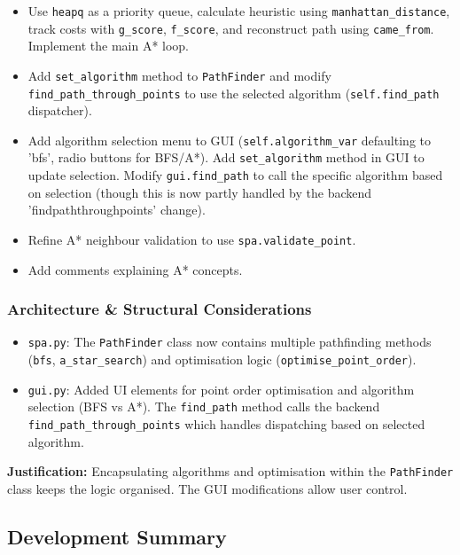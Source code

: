 \begin{enumerate}
\begin{itemize}
		\item Use \verb|heapq| as a priority queue, calculate heuristic using \verb|manhattan_distance|, track costs with \verb|g_score|, \verb|f_score|, and reconstruct path using \verb|came_from|. Implement the main A* loop.
		\item Add \verb|set_algorithm| method to \verb|PathFinder| and modify \verb|find_path_through_points| to use the selected algorithm (\verb|self.find_path| dispatcher).
		\item Add algorithm selection menu to GUI (\verb|self.algorithm_var| defaulting to 'bfs', radio buttons for BFS/A*). Add \verb|set_algorithm| method in GUI to update selection. Modify \verb|gui.find_path| to call the specific algorithm based on selection (though this is now partly handled by the backend 'findpaththroughpoints' change).
		\item Refine A* neighbour validation to use \verb|spa.validate_point|.
		\item Add comments explaining A* concepts.
	\end{itemize}
\end{enumerate}

\subsubsection{Architecture \& Structural Considerations}
\begin{itemize}
	\item \verb|spa.py|: The \verb|PathFinder| class now contains multiple pathfinding methods (\verb|bfs|, \verb|a_star_search|) and optimisation logic (\verb|optimise_point_order|).
	\item \verb|gui.py|: Added UI elements for point order optimisation and algorithm selection (BFS vs A*). The \verb|find_path| method calls the backend \verb|find_path_through_points| which handles dispatching based on selected algorithm.
\end{itemize}
\textbf{Justification:} Encapsulating algorithms and optimisation within the \verb|PathFinder| class keeps the logic organised. The GUI modifications allow user control.

\newpage
\subsection{Development Summary}


